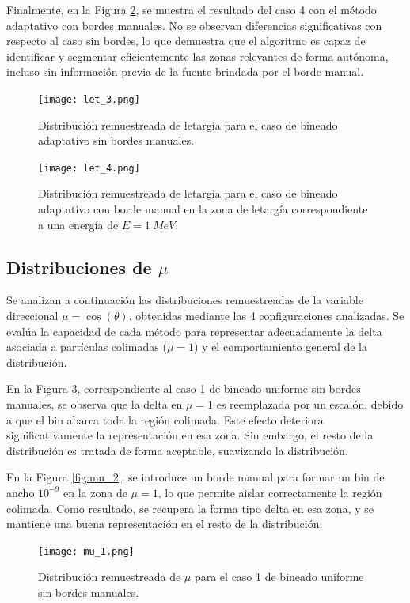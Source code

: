 Finalmente, en la Figura \ref{fig:let_4}, se muestra el resultado del caso 4 con el método adaptativo con bordes manuales. No se observan diferencias significativas con respecto al caso sin bordes, lo que demuestra que el algoritmo es capaz de identificar y segmentar eficientemente las zonas relevantes de forma autónoma, incluso sin información previa de la fuente brindada por el borde manual.

\begin{figure}[H]
    \centering
    \texttt{[image: let\_3.png]}
    \caption{Distribución remuestreada de letargía para el caso de bineado adaptativo sin bordes manuales.}
    \label{fig:let_3}
\end{figure}

\begin{figure}[H]
    \centering
    \texttt{[image: let\_4.png]}
    \caption{Distribución remuestreada de letargía para el caso de bineado adaptativo con borde manual en la zona de letargía correspondiente a una energía de $E = 1~MeV$.}
    \label{fig:let_4}
\end{figure}

\subsection{Distribuciones de $\mu$}
Se analizan a continuación las distribuciones remuestreadas de la variable direccional $\mu = \cos(\theta)$, obtenidas mediante las 4 configuraciones analizadas. Se evalúa la capacidad de cada método para representar adecuadamente la delta asociada a partículas colimadas ($\mu = 1$) y el comportamiento general de la distribución.

En la Figura \ref{fig:mu_1}, correspondiente al caso 1 de bineado uniforme sin bordes manuales, se observa que la delta en $\mu = 1$ es reemplazada por un escalón, debido a que el bin abarca toda la región colimada. Este efecto deteriora significativamente la representación en esa zona. Sin embargo, el resto de la distribución es tratada de forma aceptable, suavizando la distribución.

En la Figura \ref{fig:mu_2}, se introduce un borde manual para formar un bin de ancho $10^{-9}$ en la zona de $\mu = 1$, lo que permite aislar correctamente la región colimada. Como resultado, se recupera la forma tipo delta en esa zona, y se mantiene una buena representación en el resto de la distribución.

\begin{figure}[H]
    \centering
    \texttt{[image: mu\_1.png]}
    \caption{Distribución remuestreada de $\mu$ para el caso 1 de bineado uniforme sin bordes manuales.}
    \label{fig:mu_1}
\end{figure}

